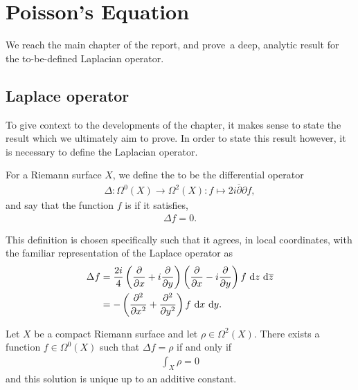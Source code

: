 \chapter{Poisson's Equation}\label{ch:poisson-eq}
\begin{chout}
	We reach the main chapter of the report, and prove\sidenotemark\ a deep,
	analytic result for the to-be-defined Laplacian operator.
\end{chout}

\section{Laplace operator}
To give context to the developments of the chapter, it makes sense to state the
result which we ultimately aim to prove. In order to state this result however,
it is necessary to define the Laplacian operator.

\begin{definition}[Laplacian]
	For a Riemann surface $ X $, we define the  to be the
	differential operator
	\begin{align*}
		\Delta: \Omega^0(X) \to \Omega^2(X):f \mapsto 2i
		\overline{\partial}\partial f,
	\end{align*}
	and say that the function $ f $ is  if it satisfies,
	\begin{align*}
		\Delta f = 0.
	\end{align*}
\end{definition}

\begin{remark}
	This definition is chosen specifically such that it agrees, in local
	coordinates, with the familiar representation of the Laplace operator as
	\begin{align*}
		\Delta f & = \frac{2i}{4} \left( \frac{\partial }{\partial x}+ i
		\frac{\partial }{\partial y} \right)\left( \frac{\partial }{\partial x}- i
		\frac{\partial }{\partial y} \right) f \operatorname{\, d\!}{z}\operatorname{\, d\!}{\overline{z}}            \\
		         & = - \left( \frac{\partial^2 }{\partial x^2}+\frac{\partial^2
		}{\partial y^2} \right)f \operatorname{\, d\!}{x}\operatorname{\, d\!}{y}.
	\end{align*}
\end{remark}

\begin{theorem}\label{thm:fredholm}
	Let $ X $ be a compact Riemann surface and let $ \rho \in \Omega^2(X) $. There
	exists a function $ f \in \Omega^0(X) $ such that $ \Delta f = \rho $ if and
	only if
	\begin{align*}
		\int_{X}{\rho} = 0
	\end{align*}
	and this solution is unique up to an additive constant.
\end{theorem}


